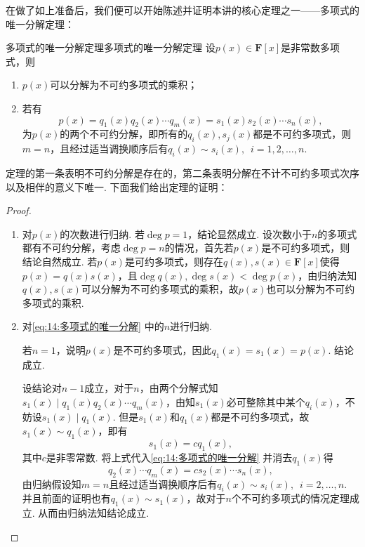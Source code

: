 在做了如上准备后，我们便可以开始陈述并证明本讲的核心定理之一——多项式的唯一分解定理：
\begin{theorem}{多项式的唯一分解定理}{多项式的唯一分解定理}
    设$p(x)\in\mathbf{F}[x]$是非常数多项式，则
    \begin{enumerate}
        \item $p(x)$可以分解为不可约多项式的乘积；
        \item 若有
              \begin{equation} \label{eq:14:多项式的唯一分解}
                  p(x)=q_1(x)q_2(x)\cdots q_m(x)=s_1(x)s_2(x)\cdots s_n(x),
              \end{equation}
              为$p(x)$的两个不可约分解，即所有的$q_i(x),s_j(x)$都是不可约多项式，则$m=n$，且经过适当调换顺序后有$q_i(x)\sim s_i(x),\enspace i=1,2,\ldots,n$.
    \end{enumerate}
\end{theorem}
定理的第一条表明不可约分解是存在的，第二条表明分解在不计不可约多项式次序以及相伴的意义下唯一. 下面我们给出定理的证明：
\begin{proof}
    \begin{enumerate}
        \item 对$p(x)$的次数进行归纳. 若$\deg p=1$，结论显然成立. 设次数小于$n$的多项式都有不可约分解，考虑$\deg p=n$的情况，首先若$p(x)$是不可约多项式，则结论自然成立. 若$p(x)$是可约多项式，则存在$q(x),s(x)\in\mathbf{F}[x]$使得$p(x)=q(x)s(x)$，且$\deg q(x),\deg s(x)<\deg p(x)$，由归纳法知$q(x),s(x)$可以分解为不可约多项式的乘积，故$p(x)$也可以分解为不可约多项式的乘积.
        \item 对\autoref{eq:14:多项式的唯一分解} 中的$n$进行归纳.

              若$n=1$，说明$p(x)$是不可约多项式，因此$q_1(x)=s_1(x)=p(x)$. 结论成立.

              设结论对$n-1$成立，对于$n$，由两个分解式知$s_1(x)\mid q_1(x)q_2(x)\cdots q_m(x)$，由知$s_1(x)$必可整除其中某个$q_i(x)$，不妨设$s_1(x)\mid q_1(x)$. 但是$s_1(x)$和$q_1(x)$都是不可约多项式，故$s_1(x)\sim q_1(x)$，即有
              \[s_1(x)=cq_1(x),\]
              其中$c$是非零常数. 将上式代入\autoref{eq:14:多项式的唯一分解} 并消去$q_1(x)$得
              \[q_2(x)\cdots q_m(x)=cs_2(x)\cdots s_n(x),\]
              由归纳假设知$m=n$且经过适当调换顺序后有$q_i(x)\sim s_i(x),\enspace i=2,\ldots,n$. 并且前面的证明也有$q_1(x)\sim s_1(x)$，故对于$n$个不可约多项式的情况定理成立. 从而由归纳法知结论成立.
    \end{enumerate}
\end{proof}

